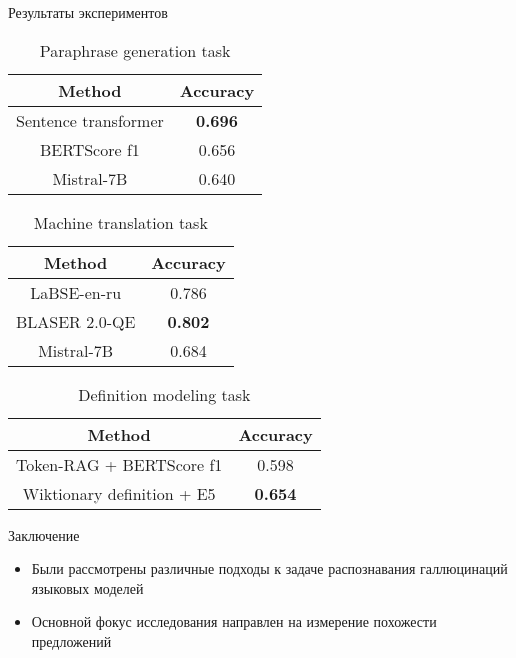 \documentclass{beamer}
\begin{document}
\begin{frame}{Результаты экспериментов}

\begin{table}[]
    \centering
    \begin{tabular}{c|c}
    Method & Accuracy \\
    \hline
    Sentence transformer & \textbf{0.696}\\
    BERTScore f1 & 0.656\\
    Mistral-7B & 0.640\\
    \end{tabular}
    \caption{Paraphrase generation task}
    \label{tab:pg}
\end{table}

\begin{table}[]
    \centering
    \begin{tabular}{c|c}
    Method & Accuracy \\
    \hline
    LaBSE-en-ru & 0.786 \\
    BLASER 2.0-QE & \textbf{0.802} \\
    Mistral-7B & 0.684\\
    \end{tabular}
    \caption{Machine translation task}
    \label{tab:mt}
\end{table}

\begin{table}[]
    \centering
    \begin{tabular}{c|c}
    Method & Accuracy \\
    \hline
    Token-RAG + BERTScore f1 & 0.598 \\
    Wiktionary definition + E5 & \textbf{0.654} \\
    \end{tabular}
    \caption{Definition modeling task}
    \label{tab:dm}
\end{table}

\end{frame}

\begin{frame}{Заключение}
  \begin{itemize}
      \item Были рассмотрены различные подходы к задаче распознавания галлюцинаций языковых моделей
      \item Основной фокус исследования направлен на измерение похожести предложений
  \end{itemize}
\end{frame}
\end{document}
